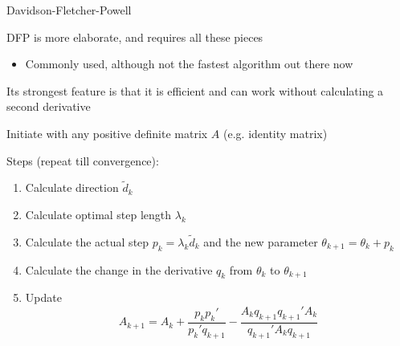 \documentclass[notes,11pt, aspectratio=169]{beamer}
\newenvironment{wideitemize}{\itemize\addtolength{\itemsep}{10pt}}{\enditemize}
\begin{document}
  \begin{frame}{Davidson-Fletcher-Powell}
    \begin{wideitemize}
    \item DFP is more elaborate, and requires all these pieces
      \begin{itemize}
      \item Commonly used, although not the fastest algorithm out there now
      \end{itemize}
    \item Its strongest feature is that it is efficient and can work
      without calculating a second derivative
    \item Initiate with any positive definite matrix $A$
      (e.g. identity matrix)
    \item Steps (repeat till convergence):
      \begin{enumerate}
      \item Calculate direction $\tilde{d}_{k}$
      \item Calculate optimal step length $\lambda_{k}$
      \item Calculate the actual step
        $p_{k} = \lambda_{k}\tilde{d}_{k}$ and the new parameter
        $\theta_{k+1} = \theta_{k}+ p_{k}$
      \item Calculate the change in the derivative $q_{k}$ from
        $\theta_{k}$ to $\theta_{k+1}$
      \item Update
        $$A_{k+1} = A_{k} + \frac{p_{k}p_{k}'}{p_{k}'q_{k+1}} - \frac{A_{k}q_{k+1}q_{k+1}'A_{k}}{q_{k+1}'A_{k}q_{k+1}}$$
      \end{enumerate}
    \end{wideitemize}
  \end{frame}
\end{document}
